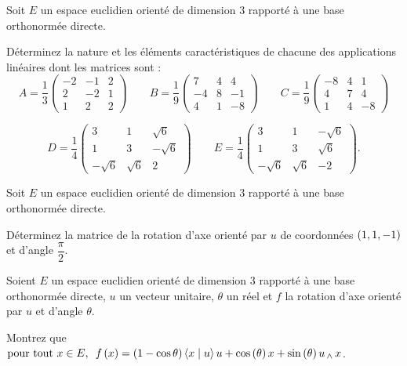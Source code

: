 \begin{exos}
Soit \(E\) un espace euclidien orienté de dimension \(3\) rapporté à une base orthonormée directe.

Déterminez la nature et les éléments caractéristiques de chacune des applications linéaires dont les matrices sont : \[A=\dfrac{1}{3}\begin{pmatrix}
-2 & -1 & 2 \\
2 & -2 & 1 \\
1 & 2 & 2
\end{pmatrix}\qquad B=\dfrac{1}{9}\begin{pmatrix}
7 & 4 & 4 \\
-4 & 8 & -1 \\
4 & 1 & -8
\end{pmatrix}\qquad C=\dfrac{1}{9}\begin{pmatrix}
-8 & 4 & 1 \\
4 & 7 & 4 \\
1 & 4 & -8
\end{pmatrix}\]

\[D=\dfrac{1}{4}\begin{pmatrix}
3 & 1 & \sqrt{6} \\
1 & 3 & -\sqrt{6} \\
-\sqrt{6} & \sqrt{6} & 2
\end{pmatrix}\qquad E=\dfrac{1}{4}\begin{pmatrix}
3 & 1 & -\sqrt{6} \\
1 & 3 & \sqrt{6} \\
-\sqrt{6} & \sqrt{6} & -2
\end{pmatrix}.\]
\end{exos}

\begin{exoss}
Soit \(E\) un espace euclidien orienté de dimension \(3\) rapporté à une base orthonormée directe.

Déterminez la matrice de la rotation d'axe orienté par \(u\) de coordonnées \(\left(1,1,-1\right)\) et d'angle \(\dfrac{\pi}{2}\).
\end{exoss}

\begin{exoss}
Soient \(E\) un espace euclidien orienté de dimension \(3\) rapporté à une base orthonormée directe, \(u\) un vecteur unitaire, \(\theta\) un réel et \(f\) la rotation d'axe orienté par \(u\) et d'angle \(\theta\).

Montrez que \(\quantifs{\tpt x\in E}f\paren{x}=\paren{1-\cos\theta}\ps{x}{u}u+\cos\paren{\theta}x+\sin\paren{\theta}u\vecto x\).
\end{exoss}

